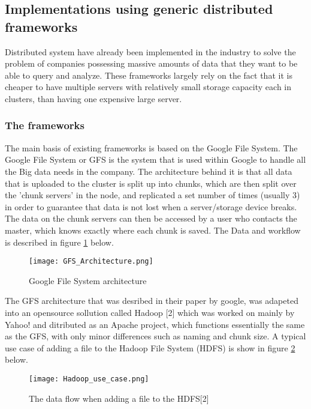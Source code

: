 \subsection{Implementations using generic distributed frameworks}
Distributed system have already been implemented in the industry to solve the
problem of companies possessing massive amounts of data that they want to be able
to query and analyze. These frameworks largely rely on the fact that it is cheaper
to have multiple servers with relatively small storage capacity each in clusters,
than having one expensive large server.

\subsubsection{The frameworks}
The main basis of existing frameworks is based on the Google File System\cite{Grem03}. The
Google File System or GFS is the system that is used within Google to handle all
the Big data needs in the company. The architecture behind it is that all data that
is uploaded to the cluster is split up into chunks, which are then split over the
'chunk servers' in the node, and replicated a set number of times (usually 3) in
order to guarantee that data is not lost when a server/storage device breaks. The
data on the chunk servers can then be accessed by a user who contacts the master,
which knows exactly where each chunk is saved.\cite{Grem03} The Data and workflow is described
in figure \ref{GFS_Architecture} below.

\begin{figure}
  \texttt{[image: GFS\_Architecture.png]}
  \caption{Google File System architecture\cite{Grem03}}
  \label{GFS_Architecture}
\end{figure}

The GFS architecture that was desribed in their paper by google, was adapeted into
an opensource sollution called Hadoop [2] which was worked on mainly by Yahoo! and
ditributed as an Apache project, which functions essentially the same as the GFS,
with only minor differences such as naming and chunk size. A typical use case of
adding a file to the Hadoop File System (HDFS) is show in figure \ref{Hadoop_usecase}
below.

\begin{figure}
  \texttt{[image: Hadoop\_use\_case.png]}
  \caption{The data flow when adding a file to the HDFS[2]}
  \label{Hadoop_usecase}
\end{figure}

